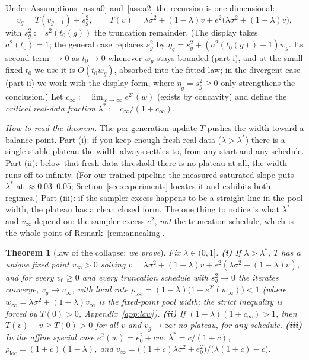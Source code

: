 \documentclass[11pt]{article}
\newtheorem{theorem}{Theorem}
\theoremstyle{remark}
\newcommand{\sigsq}{\sigma^2}
\begin{document}
Under Assumptions~\ref{ass:a0} and~\ref{ass:a2} the recursion is one-dimensional:
\begin{equation}
v_g=T(v_{g-1})+s^2_g,\qquad
T(v)=\lambda\sigsq+(1-\lambda)v+e^2\!\big(\lambda\sigsq+(1-\lambda)v\big),
\label{eq:recursion}
\end{equation}
with $s^2_g:=s^2(t_0(g))$ the truncation remainder. (The display takes $a^2(t_0)=1$;
the general case replaces $s^2_g$ by $\eta_g=s^2_g+(a^2(t_0(g))-1)w_g$. Its second
term $\to0$ as $t_0\to0$ whenever $w_g$ stays bounded (part i), and at the small fixed
$t_0$ we use it is $O(t_0 w_g)$, absorbed into the fitted law; in the divergent case
(part ii) we work with the display form, where $\eta_g=s^2_g\ge0$ only strengthens the
conclusion.) Let
$c_\infty:=\lim_{w\to\infty}e^{2\prime}(w)$ (exists by concavity) and define the
\emph{critical real-data fraction} $\lambda^*:=c_\infty/(1+c_\infty)$.

\emph{How to read the theorem.} The per-generation update $T$ pushes the width toward a
balance point. Part (i): if you keep enough fresh real data ($\lambda>\lambda^*$) there is
a single stable plateau the width always settles to, from any start and any schedule.
Part (ii): below that fresh-data threshold there is no plateau at all, the width runs off
to infinity. (For our trained pipeline the measured saturated slope puts $\lambda^*$ at
$\approx0.03$--$0.05$; Section~\ref{sec:experiments} locates it and exhibits both
regimes.) Part (iii): if the sampler excess happens to be a straight line in the pool
width, the plateau has a clean closed form. The one thing to notice is what $\lambda^*$
and $v_\infty$ depend on: the sampler excess $e^2$, \emph{not} the truncation schedule,
which is the whole point of Remark~\ref{rem:annealing}.

\begin{theorem}[law of the collapse; \emph{we prove}]\label{thm:law}
Fix $\lambda\in(0,1]$.
\textbf{(i)} If $\lambda>\lambda^*$, $T$ has a unique fixed point $v_\infty>0$ solving
$v=\lambda\sigsq+(1-\lambda)v+e^2(\lambda\sigsq+(1-\lambda)v)$, and for every $v_0\ge0$
and every truncation schedule with $s_g^2\to0$ the iterates converge, $v_g\to v_\infty$,
with local rate $\rho_{\mathrm{loc}}=(1-\lambda)\big(1+e^{2\prime}(w_\infty)\big)<1$
(where $w_\infty=\lambda\sigsq+(1-\lambda)v_\infty$ is the fixed-point pool width; the
strict inequality is forced by $T(0)>0$, Appendix~\ref{app:law}).
\textbf{(ii)} If $(1-\lambda)(1+c_\infty)>1$, then $T(v)-v\ge T(0)>0$ for all $v$ and
$v_g\to\infty$: no plateau, for any schedule.
\textbf{(iii)} In the affine special case $e^2(w)=e_0^2+cw$:
$\lambda^*=c/(1+c)$, $\rho_{\mathrm{loc}}=(1+c)(1-\lambda)$, and
$v_\infty=\big((1+c)\lambda\sigsq+e_0^2\big)/\big(\lambda(1+c)-c\big)$.
\end{theorem}
\end{document}
